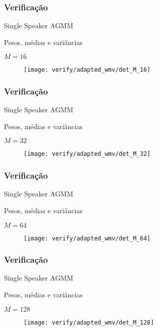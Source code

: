 \begin{frame}
\frametitle{Verificação}
\begin{description}
    \item[SSAGMM] Single Speaker AGMM
    \item[Adaptação] Pesos, médias e variâncias
    \item $M = 16$
\end{description}

\begin{figure}[ht]
    \centering
    \texttt{[image: verify/adapted\_wmv/det\_M\_16]}
\end{figure}
\end{frame}

\begin{frame}
\frametitle{Verificação}
\begin{description}
    \item[SSAGMM] Single Speaker AGMM
    \item[Adaptação] Pesos, médias e variâncias
    \item $M = 32$
\end{description}

\begin{figure}[ht]
    \centering
    \texttt{[image: verify/adapted\_wmv/det\_M\_32]}
\end{figure}
\end{frame}

\begin{frame}
\frametitle{Verificação}
\begin{description}
    \item[SSAGMM] Single Speaker AGMM
    \item[Adaptação] Pesos, médias e variâncias
    \item $M = 64$
\end{description}

\begin{figure}[ht]
    \centering
    \texttt{[image: verify/adapted\_wmv/det\_M\_64]}
\end{figure}
\end{frame}

\begin{frame}
\frametitle{Verificação}
\begin{description}
    \item[SSAGMM] Single Speaker AGMM
    \item[Adaptação] Pesos, médias e variâncias
    \item $M = 128$
\end{description}

\begin{figure}[ht]
    \centering
    \texttt{[image: verify/adapted\_wmv/det\_M\_128]}
\end{figure}
\end{frame}